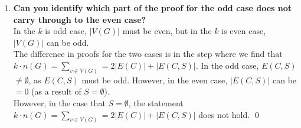 \begin{enumerate}[label=\textbf{(\alph*)}]
{    For any $k \in \nat_{even}$, any $k$-regular $f(k)$-edge-connected graph $G$ has a perfect matching.\\
    \linebreak
    Proof} \\
    \unboldmath
   In the case that we would remove only edges adjacent to 1 vertex $v$, we can remove at most $d(v)-1$ edges for the graph to remain connected. So, in a $k$-regular graph, the maximum edge connectivity is $k$. This means $f(k) \leq k$. \\
   \linebreak 
   In fact, we know that in order for $G$ to have a perfect matching Tutte's theorem must hold. Using a similar approach a), we know that $|E(C,S)| \geq f(k)$ and $\forall \:\:  S, \:\: k|S| \geq f(k) q(G-s)$. From this it follows that $f(k) \geq k$. \\
   \linebreak 
   Combining $f(k) \geq k$ and $f(k) \leq k$, we know the only appropriate function can be $f(k) = k$. However, this function does not hold for all even values of $k$. Take $k=2$, any odd-length cycle is both 2-regular and 2-edge connected but does not contain a perfect matching as it has an odd number of vertices. \qed 
    \item\textbf{Can you identify which part of the proof for the odd case does not carry through to the even case?} \\
    \linebreak 
    In the $k$ is odd case, $|V(G)|$ must be even, but in the $k$ is even case, $|V(G)|$ can be odd. \\
    \linebreak 
    The difference in proofs for the two cases is in the step where we find that $k\cdot n(G) = \sum_{v \in V(G)} = 2|E(C)| + |E(C,S)|$. In the odd case, $E(C,S)$ $\neq \emptyset$, as $E(C,S)$ must be odd. However, in the even case, $|E(C,S)|$ can be $=0$ (as a result of $S = \emptyset$). \\
    \linebreak 
    However, in the case that $S = \emptyset$, the statement $k\cdot n(G) = \sum_{v \in V(G)} = 2|E(C)| + |E(C,S)|$ does not hold. \qed
\end{enumerate}